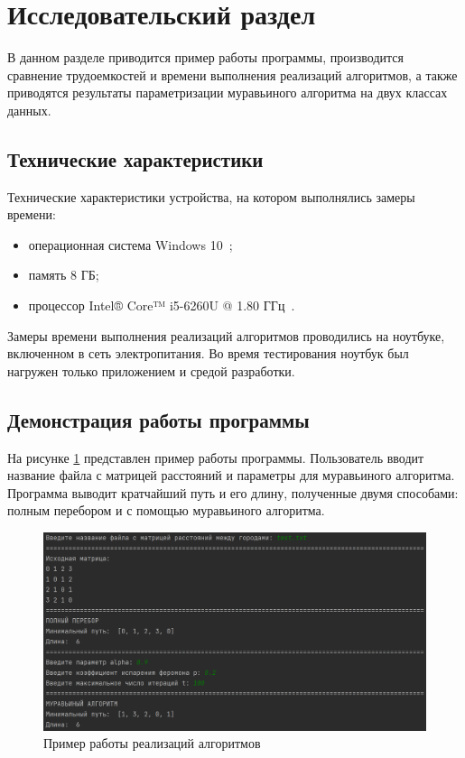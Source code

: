 \section{Исследовательский раздел \hfill}
\vspace{\baselineskip}

В данном разделе приводится пример работы программы, производится сравнение трудоемкостей и времени выполнения реализаций алгоритмов, а также приводятся результаты параметризации муравьиного алгоритма на двух классах данных.

\vspace{\baselineskip}
\subsection{Технические характеристики}
\vspace{\baselineskip}

Технические характеристики устройства, на котором выполнялись замеры времени:

\begin{itemize}[label=---]
	\item операционная система Windows 10~\cite{windows};
	\item память 8 ГБ;
	\item процессор Intel® Core™ i5-6260U @ 1.80 ГГц~\cite{processor}.
\end{itemize}

Замеры времени выполнения реализаций алгоритмов проводились на ноутбуке, включенном в сеть электропитания. 
Во время тестирования ноутбук был нагружен только приложением и средой разработки.

\vspace{\baselineskip}
\subsection{Демонстрация работы программы}
\vspace{\baselineskip}

На рисунке \ref{fig:output} представлен пример работы программы.
Пользователь вводит название файла с матрицей расстояний и параметры для муравьиного алгоритма. 
Программа выводит кратчайший путь и его длину, полученные двумя способами: полным перебором и с помощью муравьиного алгоритма.
\clearpage

\begin{figure}[h!btp]
	\centering
	\includegraphics[width=420pt]{inc/output.png}
	\caption{Пример работы реализаций алгоритмов}
	\label{fig:output}	
\end{figure}


